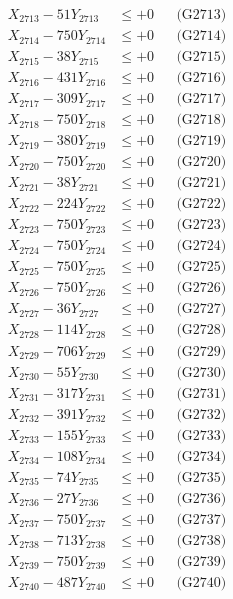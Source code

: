 \documentclass[a4paper,10pt]{article}
\begin{document}
{\begin{align}
X_{2713} - 51Y_{2713} &\leq +0 && \text{(G2713)} \\
X_{2714} - 750Y_{2714} &\leq +0 && \text{(G2714)} \\
X_{2715} - 38Y_{2715} &\leq +0 && \text{(G2715)} \\
X_{2716} - 431Y_{2716} &\leq +0 && \text{(G2716)} \\
X_{2717} - 309Y_{2717} &\leq +0 && \text{(G2717)} \\
X_{2718} - 750Y_{2718} &\leq +0 && \text{(G2718)} \\
X_{2719} - 380Y_{2719} &\leq +0 && \text{(G2719)} \\
X_{2720} - 750Y_{2720} &\leq +0 && \text{(G2720)} \\
\allowbreak
X_{2721} - 38Y_{2721} &\leq +0 && \text{(G2721)} \\
X_{2722} - 224Y_{2722} &\leq +0 && \text{(G2722)} \\
X_{2723} - 750Y_{2723} &\leq +0 && \text{(G2723)} \\
X_{2724} - 750Y_{2724} &\leq +0 && \text{(G2724)} \\
X_{2725} - 750Y_{2725} &\leq +0 && \text{(G2725)} \\
X_{2726} - 750Y_{2726} &\leq +0 && \text{(G2726)} \\
X_{2727} - 36Y_{2727} &\leq +0 && \text{(G2727)} \\
X_{2728} - 114Y_{2728} &\leq +0 && \text{(G2728)} \\
X_{2729} - 706Y_{2729} &\leq +0 && \text{(G2729)} \\
X_{2730} - 55Y_{2730} &\leq +0 && \text{(G2730)} \\
\allowbreak
X_{2731} - 317Y_{2731} &\leq +0 && \text{(G2731)} \\
X_{2732} - 391Y_{2732} &\leq +0 && \text{(G2732)} \\
X_{2733} - 155Y_{2733} &\leq +0 && \text{(G2733)} \\
X_{2734} - 108Y_{2734} &\leq +0 && \text{(G2734)} \\
X_{2735} - 74Y_{2735} &\leq +0 && \text{(G2735)} \\
X_{2736} - 27Y_{2736} &\leq +0 && \text{(G2736)} \\
X_{2737} - 750Y_{2737} &\leq +0 && \text{(G2737)} \\
X_{2738} - 713Y_{2738} &\leq +0 && \text{(G2738)} \\
X_{2739} - 750Y_{2739} &\leq +0 && \text{(G2739)} \\
X_{2740} - 487Y_{2740} &\leq +0 && \text{(G2740)} \\

\end{align}}
\end{document}
